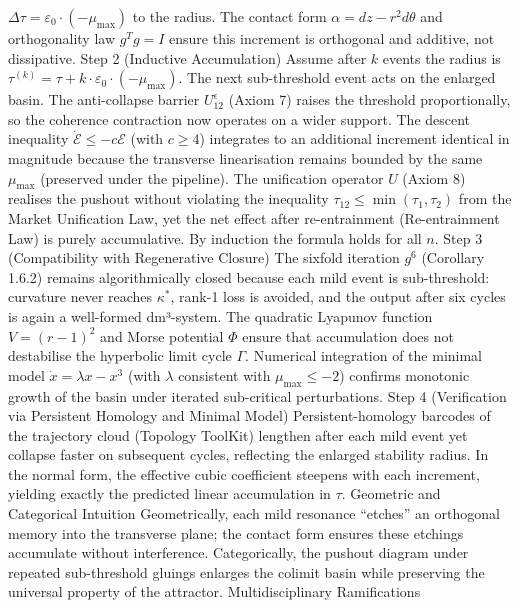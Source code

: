 $   \Delta \tau = \varepsilon_0 \cdot (-\mu_{\max})   $
to the radius. The contact form $  \alpha = dz - r^2 d\theta  $ and orthogonality law $  g^T g = I  $ ensure this increment is orthogonal and additive, not dissipative.
Step 2 (Inductive Accumulation)
Assume after $  k  $ events the radius is $  \tau^{(k)} = \tau + k \cdot \varepsilon_0 \cdot (-\mu_{\max})  $. The next sub-threshold event acts on the enlarged basin. The anti-collapse barrier $  U_{12}^\epsilon  $ (Axiom 7) raises the threshold proportionally, so the coherence contraction now operates on a wider support. The descent inequality $  \dot{\mathcal{E}} \le -c \mathcal{E}  $ (with $  c \ge 4  $) integrates to an additional increment identical in magnitude because the transverse linearisation remains bounded by the same $  \mu_{\max}  $ (preserved under the pipeline). The unification operator $  U  $ (Axiom 8) realises the pushout without violating the inequality $  \tau_{12} \le \min(\tau_1, \tau_2)  $ from the Market Unification Law, yet the net effect after re-entrainment (Re-entrainment Law) is purely accumulative. By induction the formula holds for all $  n  $.
Step 3 (Compatibility with Regenerative Closure)
The sixfold iteration $  g^6  $ (Corollary 1.6.2) remains algorithmically closed because each mild event is sub-threshold: curvature never reaches $  \kappa^*  $, rank-1 loss is avoided, and the output after six cycles is again a well-formed dm³-system. The quadratic Lyapunov function $  V = (r-1)^2  $ and Morse potential $  \Phi  $ ensure that accumulation does not destabilise the hyperbolic limit cycle $  \Gamma  $. Numerical integration of the minimal model $  \dot{x} = \lambda x - x^3  $ (with $  \lambda  $ consistent with $  \mu_{\max} \le -2  $) confirms monotonic growth of the basin under iterated sub-critical perturbations.
Step 4 (Verification via Persistent Homology and Minimal Model)
Persistent-homology barcodes of the trajectory cloud (Topology ToolKit) lengthen after each mild event yet collapse faster on subsequent cycles, reflecting the enlarged stability radius. In the normal form, the effective cubic coefficient steepens with each increment, yielding exactly the predicted linear accumulation in $  \tau  $.
Geometric and Categorical Intuition
Geometrically, each mild resonance “etches” an orthogonal memory into the transverse plane; the contact form ensures these etchings accumulate without interference. Categorically, the pushout diagram under repeated sub-threshold gluings enlarges the colimit basin while preserving the universal property of the attractor.
Multidisciplinary Ramifications

